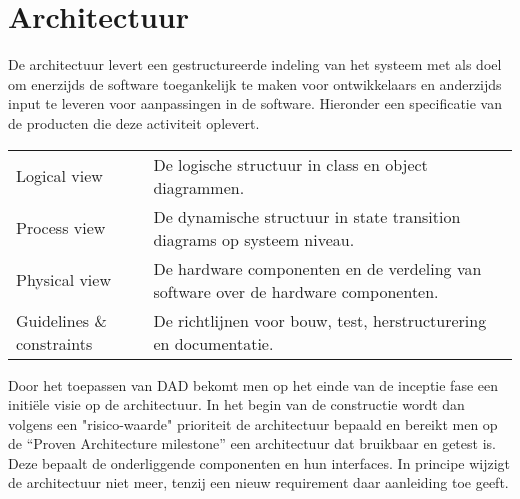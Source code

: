 
\section{Architectuur}

De architectuur levert een gestructureerde indeling van het systeem met als doel om enerzijds de software
toegankelijk te maken voor ontwikkelaars en anderzijds input te leveren voor aanpassingen in de software. Hieronder
een specificatie van de producten die deze activiteit oplevert.

{\tiny
\begin{center}
\begin{tabular}{lp{30em}}
Logical view & De logische structuur in class en object diagrammen.\\
Process view & De dynamische structuur in state
transition diagrams op systeem niveau.\\
Physical view &  De hardware componenten en de verdeling van
software over de hardware componenten.\\
Guidelines \& constraints & De richtlijnen voor bouw,
test, herstructurering en documentatie.\\
\end{tabular}
\end{center}
}

Door het toepassen van DAD bekomt men op het einde van de inceptie fase een
initi\"ele visie op de architectuur. In het begin van de constructie wordt dan
volgens een "risico-waarde" prioriteit de architectuur bepaald en bereikt men
op de ``Proven Architecture milestone'' een architectuur dat bruikbaar en getest
is. Deze bepaalt de onderliggende componenten en hun interfaces.
In principe wijzigt de architectuur niet meer, tenzij een nieuw requirement
daar aanleiding toe geeft.